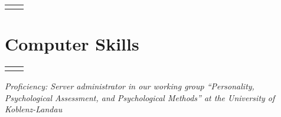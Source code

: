 \documentclass[10pt]{FreemanCV}
\begin{document}
\begin{paracol}{2}
\begin{supertabular}{r l}
	

\end{supertabular}


\section{Computer Skills} 




\begin{supertabular}{r l}
	

	



	
\end{supertabular}

\textit{Proficiency: Server administrator in our working group
\enquote{Personality, Psychological Assessment, and Psychological Methods} at
the University of Koblenz-Landau}



\end{paracol}
\end{document}
